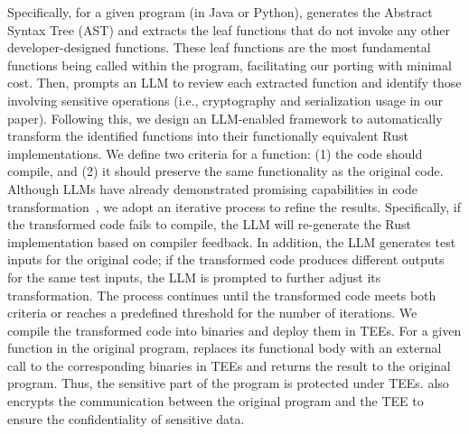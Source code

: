 Specifically, for a given program (in Java or Python), \system generates the Abstract Syntax Tree (AST) and extracts the leaf functions that do not invoke any other developer-designed functions.
These leaf functions are the most fundamental functions being called within the program, facilitating our porting with minimal cost.
Then, \system prompts an LLM to review each extracted function and identify those involving sensitive operations (i.e., cryptography and serialization usage in our paper).
Following this, we design an LLM-enabled framework to automatically transform the identified functions into their functionally equivalent Rust implementations.
We define two criteria for a  function: (1) the code should compile, and (2) it should preserve the same functionality as the original code.
Although LLMs have already demonstrated promising capabilities in code transformation~\cite{pacmseDilharaBBD24,dainese2024can}, we adopt an iterative process to refine the results. Specifically, if the transformed code fails to compile, the LLM will re-generate the Rust implementation based on compiler feedback.
In addition, the LLM generates test inputs for the original code; if the transformed code produces different outputs for the same test inputs, the LLM is prompted to further adjust its transformation.
The process continues until the transformed code meets both criteria or reaches a predefined threshold for the number of iterations.
We compile the transformed code into binaries and deploy them in TEEs.
For a given function in the original program, \system replaces its functional body with an external call to the corresponding binaries in TEEs and returns the result to the original program.
Thus, the sensitive part of the program is protected under TEEs.
\system also encrypts the communication between the original program and the TEE to ensure the confidentiality of sensitive data.


